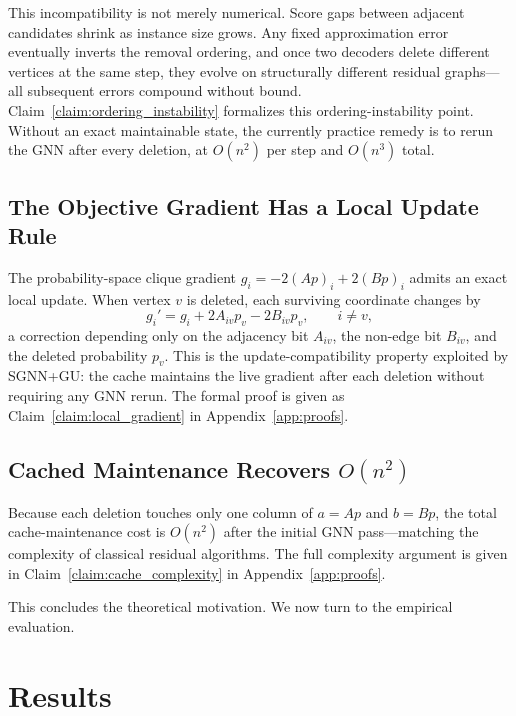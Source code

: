\documentclass[mathematics,article,submit,pdftex,moreauthors]{Definitions/mdpi}
\begin{document}
This incompatibility is not merely numerical. Score gaps between adjacent candidates
shrink as instance size grows. Any fixed approximation error eventually inverts the
removal ordering, and once two decoders delete different vertices at the same step,
they evolve on structurally different residual graphs---all subsequent errors
compound without bound. Claim~\ref{claim:ordering_instability} formalizes this
ordering-instability point. Without an exact maintainable state, the currently practice remedy is to rerun the GNN after every deletion, at $O(n^2)$ per step and
$O(n^3)$ total.

\subsection{The Objective Gradient Has a Local Update Rule}

The probability-space clique gradient $g_i = -2(Ap)_i + 2(Bp)_i$ admits an exact
local update. When vertex $v$ is deleted, each surviving coordinate changes by
\[
  g_i' = g_i + 2A_{iv}p_v - 2B_{iv}p_v, \qquad i \neq v,
\]
a correction depending only on the adjacency bit $A_{iv}$, the non-edge bit
$B_{iv}$, and the deleted probability $p_v$. This is the update-compatibility
property exploited by \textsc{SGNN+GU}: the cache maintains the live gradient after
each deletion without requiring any GNN rerun. The formal proof is given as
Claim~\ref{claim:local_gradient} in Appendix~\ref{app:proofs}.

\subsection{Cached Maintenance Recovers $O(n^2)$}

Because each deletion touches only one column of $a=Ap$ and $b=Bp$, the total
cache-maintenance cost is $O(n^2)$ after the initial GNN pass---matching the
complexity of classical residual algorithms. The full complexity argument is given
in Claim~\ref{claim:cache_complexity} in Appendix~\ref{app:proofs}.

This concludes the theoretical motivation. We now turn to the empirical evaluation.

\section{Results}
\label{sec:experiments}
\end{document}

